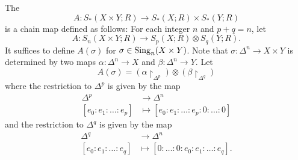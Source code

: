 \documentclass{standalone}
\begin{document}
\begin{definition}
  The 
  \[
    A \colon S_*(X \times Y; R) \to S_*(X; R) \times S_*(Y; R)
  \]
  is a chain map defined as follows:
  For each integer \(n\) and \(p + q = n\), let
  \[
    A \colon S_n(X \times Y; R) \to S_p(X; R) \otimes S_q(Y; R).
  \]
  It suffices to define \(A(\sigma)\) for \(\sigma \in \operatorname{Sing}_n(X \times Y)\).
  Note that \(\sigma \colon \Delta^n \to X \times Y\) is determined
  by two maps \(\alpha \colon \Delta^n \to X\)
  and \(\beta \colon \Delta^n \to Y\).
  Let
  \[
    A(\sigma) = (\alpha {\restriction}_{\Delta^p}) \otimes
                (\beta {\restriction}_{\Delta^q})
  \]
  where the restriction to \(\Delta^p\) is given by the map
  \begin{align*}
    \Delta^p &\to \Delta^n \\[-1ex]
       [e_0: e_1: \dots: e_p] &\mapsto [e_0: e_1: \dots: e_p: 0: \dots: 0]
  \end{align*}
  and the restriction to \(\Delta^q\) is given by the map
  \begin{align*}
    \Delta^q &\to \Delta^n \\[-1ex]
       [e_0: e_1: \dots: e_q] &\mapsto [0: \dots: 0: e_0: e_1: \dots: e_q].
  \end{align*}
\end{definition}
\end{document}
